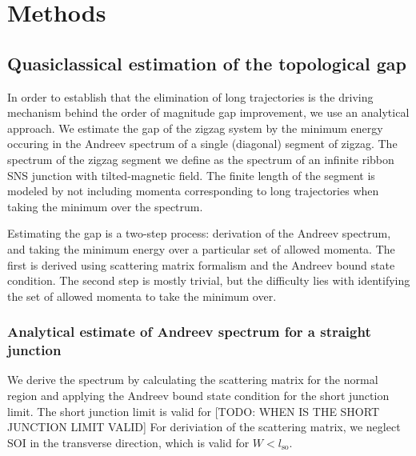 \chapter{Methods}


\section{Quasiclassical estimation of the topological gap}
	In order to establish that the elimination of long trajectories is the driving mechanism behind the order of magnitude gap improvement, we use an analytical approach.
	We estimate the gap of the zigzag system by the minimum energy occuring in the Andreev spectrum of a single (diagonal) segment of zigzag.
	The spectrum of the zigzag segment we define as the spectrum of an infinite ribbon SNS junction with tilted-magnetic field. 
	The finite length of the segment is modeled by not including momenta corresponding to long trajectories when taking the minimum over the spectrum.


	Estimating the gap is a two-step process: derivation of the Andreev spectrum, and taking the minimum energy over a particular set of allowed momenta.
	The first is derived using scattering matrix formalism and the Andreev bound state condition\cite{beenakker1991universal, sticlet_robustness_2017}.
	The second step is mostly trivial, but the difficulty lies with identifying the set of allowed  momenta to take the minimum over.


	\subsection{Analytical estimate of Andreev spectrum for a straight junction}
		
		We derive the spectrum by calculating the scattering matrix for the normal region and applying the Andreev bound state condition for the short junction limit\cite{beenakker1991universal, sticlet_robustness_2017}. 
		The short junction limit is valid for [TODO: WHEN IS THE SHORT JUNCTION LIMIT VALID]
		For deriviation of the scattering matrix, we neglect SOI in the transverse direction, which is valid for $W<l_\text{so}$.

